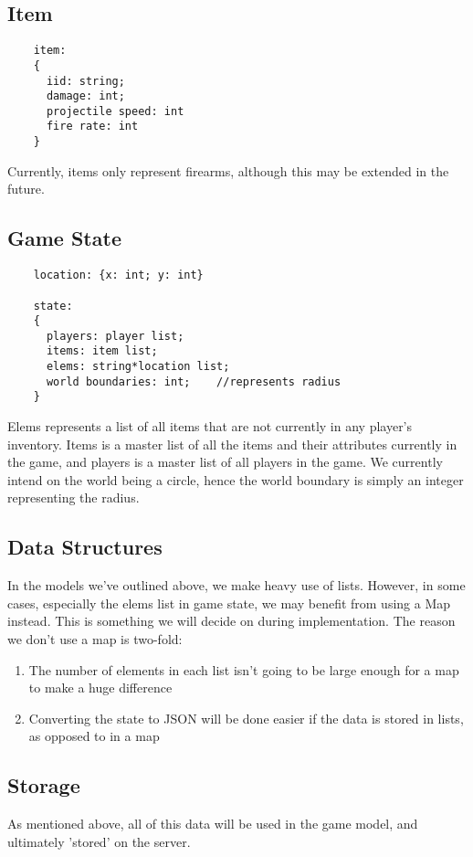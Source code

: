 \documentclass{article}
\begin{document}
	\subsection{Item}
	\begin{verbatim}
	item: 
	{
	  iid: string;
	  damage: int;
	  projectile speed: int
	  fire rate: int
	}
	\end{verbatim}
	Currently, items only represent firearms, although this may be extended in the future.
	
	\subsection{Game State}
	\begin{verbatim}
	location: {x: int; y: int}
	
	state:
	{
	  players: player list;
	  items: item list;
	  elems: string*location list;
	  world boundaries: int;	//represents radius
	}
	\end{verbatim}
	Elems represents a list of all items that are not currently in any player's inventory. Items is a master list of all the items and their attributes currently in the game, and players is a master list of all players in the game. We currently intend on the world being a circle, hence the world boundary is simply an integer representing the radius.
    
    \subsection{Data Structures}
    In the models we've outlined above, we make heavy use of lists. However, in some cases, especially the elems list in game state, we may benefit from using a Map instead. This is something we will decide on during implementation. The reason we don't use a map is two-fold:
    \begin{enumerate}
    	\item The number of elements in each list isn't going to be large enough for a map to make a huge difference
	\item Converting the state to JSON will be done easier if the data is stored in lists, as opposed to in a map	
    \end{enumerate}
    
    \subsection{Storage}
    As mentioned above, all of this data will be used in the game model, and ultimately 'stored' on the server.
    
\end{document}
